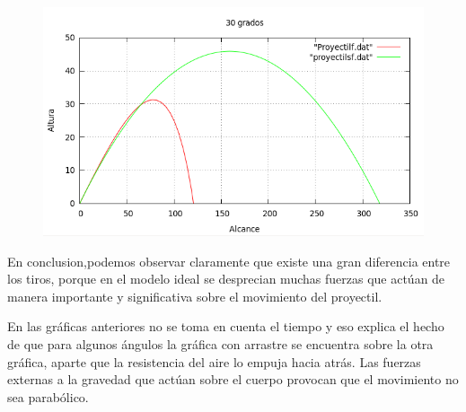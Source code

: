 \documentclass[a4paper]{article}
\begin{document}
\begin{figure}[ht]
\centering
\includegraphics[width=10 cm]{30.png}
\end{figure}

En conclusion,podemos observar claramente que existe una gran diferencia entre los tiros, porque en el modelo ideal se desprecian muchas fuerzas que actúan de manera importante y significativa sobre el movimiento del proyectil.

En las gráficas anteriores no se toma en cuenta el tiempo y eso explica el hecho de que para algunos ángulos la gráfica con arrastre se encuentra sobre la otra gráfica, aparte que la resistencia del aire lo empuja hacia atrás. Las fuerzas externas a la gravedad que actúan sobre el cuerpo provocan que el movimiento no sea parabólico.
\end{document}

